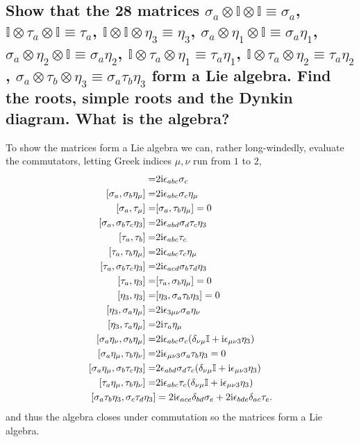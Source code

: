 \documentclass[main.tex]{subfiles}
\begin{document}
\subsection{Show that the 28 matrices $\sigma_a\otimes\mathbb{I}\otimes\mathbb{I}\equiv\sigma_a$, $\mathbb{I}\otimes\tau_a\otimes\mathbb{I}\equiv\tau_a$, $\mathbb{I}\otimes\mathbb{I}\otimes\eta_3\equiv\eta_3$, $\sigma_a\otimes\eta_1\otimes\mathbb{I}\equiv\sigma_a\eta_1$, $\sigma_a\otimes\eta_2\otimes\mathbb{I}\equiv\sigma_a\eta_2$, $\mathbb{I}\otimes\tau_a\otimes\eta_1\equiv\tau_a\eta_1$, $\mathbb{I}\otimes\tau_a\otimes\eta_2\equiv\tau_a\eta_2$, $\sigma_a\otimes\tau_b\otimes\eta_3\equiv\sigma_a\tau_b\eta_3$ form a Lie algebra. Find the roots, simple roots and the Dynkin diagram. What is the algebra?}
To show the matrices form a Lie algebra we can, rather long-windedly, evaluate the commutators, letting Greek indices $\mu,\nu$ run from $1$ to $2$,
\begin{align}
[\sigma_a,\sigma_b]=&2\img\epsilon_{abc}\sigma_c\\
[\sigma_a,\sigma_b\eta_{\mu}]=&2\img\epsilon_{abc}\sigma_c\eta_{\mu}\\
[\sigma_a,\tau_{\mu}]=&[\sigma_a,\tau_b\eta_{\mu}]=0\\
[\sigma_a,\sigma_b\tau_c\eta_3]=&2\img\epsilon_{abd}\sigma_d\tau_c\eta_3\\
[\tau_a,\tau_b]=&2\img\epsilon_{abc}\tau_c\\
[\tau_a,\tau_b\eta_{\mu}]=&2\img\epsilon_{abc}\tau_c\eta_{\mu}\\
[\tau_a,\sigma_b\tau_c\eta_3]=&2\img\epsilon_{acd}\sigma_b\tau_d\eta_3\\
[\tau_a,\eta_3]=&[\tau_a,\sigma_b\eta_{\mu}]=0\\
[\eta_3,\eta_3]=&[\eta_3,\sigma_a\tau_b\eta_3]=0\\
[\eta_3,\sigma_a\eta_{\mu}]=&2\img\epsilon_{3\mu\nu}\sigma_a\eta_{\nu}\\
[\eta_3,\tau_a\eta_{\mu}]=&2\img\tau_a\eta_{\mu}\\
[\sigma_a\eta_{\nu},\sigma_b\eta_{\mu}]=&2\img\epsilon_{abc}\sigma_c(\delta_{\nu\mu}\mathbb{I}+\img\epsilon_{\mu\nu3}\eta_3)\\
[\sigma_a\eta_{\mu},\tau_b\eta_{\nu}]=&2\img\epsilon_{\mu\nu3}\sigma_a\tau_b\eta_3=0\\
[\sigma_a\eta_{\mu},\sigma_b\tau_c\eta_3]=&2\epsilon_{abd}\sigma_d\tau_c(\delta_{\nu\mu}\mathbb{I}+\img\epsilon_{\mu\nu3}\eta_3)\\
[\tau_a\eta_{\mu},\tau_b\eta_{\nu}]=&2\img\epsilon_{abc}\tau_c(\delta_{\nu\mu}\mathbb{I}+\img\epsilon_{\mu\nu3}\eta_3)\\
[\sigma_a\tau_b\eta_3,\sigma_c\tau_d\eta_3]&=2\img\epsilon_{ace}\delta_{bd}\sigma_e+2\img\epsilon_{bde}\delta_{ac}\tau_e.
\end{align}
 and thus the algebra closes under commutation so the matrices form a Lie algebra.
 
\end{document}
